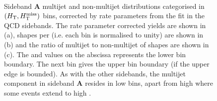 \begin{figure}[!h]
  \centering
   \\
  \caption{Sideband \textbf{A} multijet and non-multijet distributions
    categorised in $(\mbox{$H_\text{T}$}, \mbox{$H_{\rm T}^{\rm miss}$})$ bins, corrected by rate parameters
    from the fit in the QCD sidebands. The rate parameter corrected yields
    are shown in (a), \HTmiss shapes per \scalht (i.e. each \scalht bin is normalised
    to unity) are shown in (b) and the ratio of multijet to non-multijet of
    \HTmiss shapes are shown in (c). The \scalht and \HTmiss values on the 
    abscissa represents the lower bin boundary. The next bin gives the upper
    bin boundary (if the upper edge is bounded). As with the other sidebands,
    the multijet component in sideband \textbf{A} resides in low \HTmiss
    bins, apart from high \scalht where some events extend to high \HTmiss.}
  \label{fig:qcd_mht_shapes_doublesb}
\end{figure}

